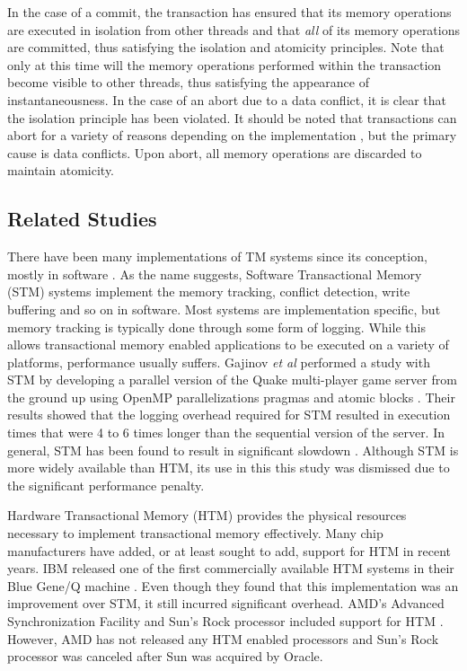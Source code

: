 \documentclass{sig-alternate}
\begin{document}
In the case of a commit, the transaction has ensured that its memory operations are
executed in isolation from other threads and that \emph{all} of its memory operations are
committed, thus satisfying the isolation and atomicity principles.  Note that only at this
time will the memory operations performed within the transaction become visible to other
threads, thus satisfying the appearance of instantaneousness.  In the case of an abort due
to a data conflict, it is clear that the isolation principle has been violated.  It should
be noted that transactions can abort for a variety of reasons depending on the
implementation \cite{intel_opt_man,chung_amd}, but the primary cause is data conflicts.
Upon abort, all memory operations are discarded to maintain atomicity.

\subsection{Related Studies}

There have been many implementations of TM systems since its conception, mostly in software
\cite{yoo_tsx,chitters_tsx,rock_dice,chung_amd,blue_wang,quake_stm,stm_cascaval}.  As the
name suggests, Software Transactional Memory (STM) systems implement the memory tracking,
conflict detection, write buffering and so on in software.  Most systems are
implementation specific, but memory tracking is typically done through some form of
logging.  While this allows transactional memory enabled applications to be executed on a
variety of platforms, performance usually suffers.  Gajinov \emph{et al} performed a study
with STM by developing a parallel version of the Quake multi-player game server from the
ground up using OpenMP parallelizations pragmas and atomic blocks \cite{quake_stm}.  Their
results showed that the logging overhead required for STM resulted in execution times that
were 4 to 6 times longer than the sequential version of the server.  In general, STM has
been found to result in significant slowdown \cite{stm_cascaval}.  Although STM is more
widely available than HTM, its use in this this study was dismissed due to the significant
performance penalty.

Hardware Transactional Memory (HTM) provides the physical resources necessary to implement
transactional memory effectively.  Many chip manufacturers have added, or at least sought
to add, support for HTM in recent years.  IBM released one of the first commercially
available HTM systems in their Blue Gene/Q machine \cite{blue_wang}.  Even though they
found that this implementation was an improvement over STM, it still incurred significant
overhead.  AMD's Advanced Synchronization Facility and Sun's Rock processor included
support for HTM \cite{chung_amd,rock_dice}.  However, AMD has not released any HTM enabled
processors and Sun's Rock processor was canceled after Sun was acquired by Oracle.
\end{document}
